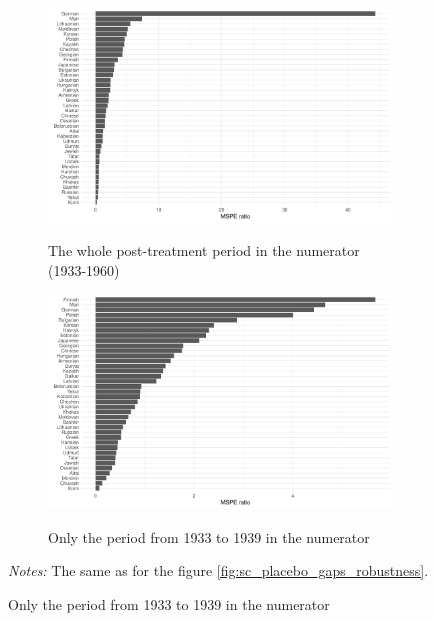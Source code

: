 \begin{figure}[H] 
\caption{Ratios of post-treatment MSPE to pre-treatment MSPE}
\begin{subfigure}{\textwidth}
\caption{The whole post-treatment period in the numerator (1933-1960)}
\includegraphics[width=\linewidth]{plots/synthetic_control/ethnicity_imputation/annual/mspe_ratios_imp_date_robustness.pdf}
\label{fig:sc_mspe_ratios_all_robustness}
\end{subfigure}
\begin{subfigure}{\textwidth}
\caption{Only the period from 1933 to 1939 in the numerator}
\includegraphics[width=\linewidth]{plots/synthetic_control/ethnicity_imputation/annual/mspe_ratios_imp_date_until_1939_robustness.pdf}
\label{fig:sc_mspe_ratios_until_1939_robustness}
\end{subfigure}
\label{fig:sc_mspe_ratios_robustness}
\begin{minipage}{0.92\textwidth}
\footnotesize
\emph{Notes:} The same as for the figure \ref{fig:sc_placebo_gaps_robustness}.
\end{minipage}
\end{figure}



